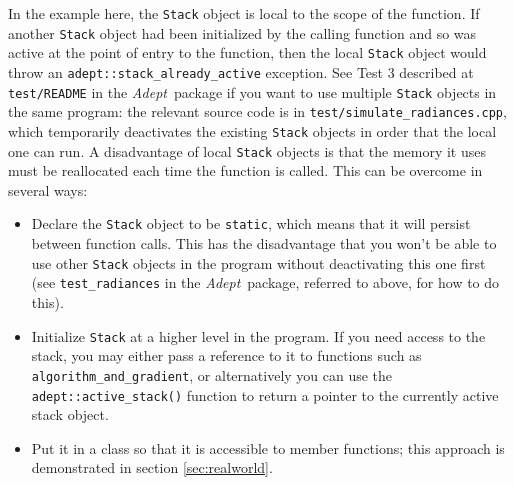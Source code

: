 \documentclass[a4,oneside]{book}
\def\codesize{\small}
\def\Adept{\emph{Adept}}
\def\code#1{{\codesize\texttt{#1}}}
\begin{document}
In the example here, the \code{Stack} object is local to the scope of
the function. If another \code{Stack} object had been initialized by
the calling function and so was active at the point of entry to the
function, then the local \code{Stack} object would throw an
\code{adept::stack\_already\_active} exception. See Test 3 described
at \code{test/README} in the \Adept\ package if you want to use
multiple \code{Stack} objects in the same program: the relevant source
code is in \code{test/simulate\_radiances.cpp}, which temporarily
deactivates the existing \code{Stack} objects in order that the local
one can run.  A disadvantage of local \code{Stack} objects is that the
memory it uses must be reallocated each time the function is called.
This can be overcome in several ways:
\begin{itemize}
\item Declare the \code{Stack} object to be \code{static}, which means
  that it will persist between function calls. This has the
  disadvantage that you won't be able to use other \code{Stack}
  objects in the program without deactivating this one first (see \code{test\_radiances} in the \Adept\ package, referred to above, for how to do this).
\item Initialize \code{Stack} at a higher level in the program. If you
  need access to the stack, you may either pass a reference to it to
  functions such as \code{algorithm\_and\_gradient}, or alternatively
  you can use the \code{adept::active\_stack()} function to return a
  pointer to the currently active stack object.
\item Put it in a class so that it is accessible to member functions;
  this approach is demonstrated in section \ref{sec:realworld}.
\end{itemize}
%
\end{document}
